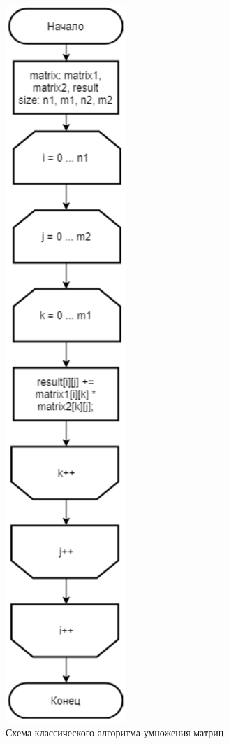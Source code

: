\documentclass[a4paper, 12pt]{article}
\begin{document}
\begin{flushleft}
\begin{figure}[h!]
		\centering \includegraphics[scale=1.2]{classic}
		\centering \caption{Схема классического алгоритма умножения матриц}
	\end{figure}
	\clearpage
	\newpage


\end{flushleft}
\end{document}
